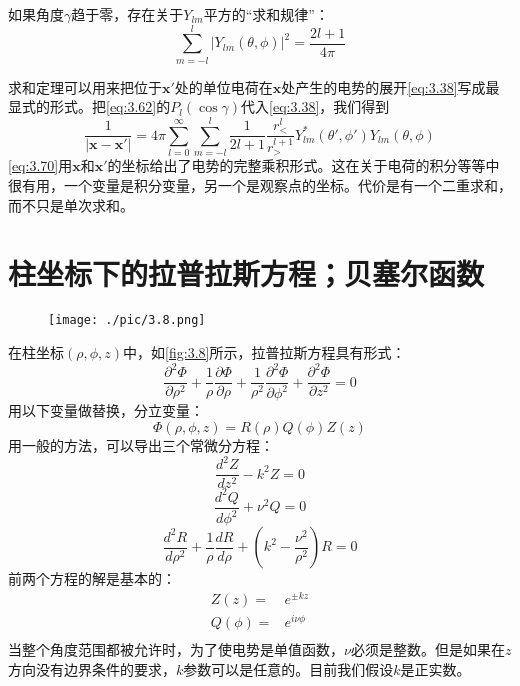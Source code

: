 \documentclass[12pt]{book}
\numberwithin{equation}{chapter}
\numberwithin{figure}{chapter}
\numberwithin{footnote}{page}
\begin{document}
如果角度$\gamma$趋于零，存在关于$Y_{lm}$平方的“求和规律”：
\begin{equation}\label{eq:3.69}
    \sum_{m=-l}^l|Y_{lm}(\theta,\phi)|^2=\frac{2l+1}{4\pi}
\end{equation}

求和定理可以用来把位于$\mathbf{x'}$处的单位电荷在$\mathbf{x}$处产生的电势的展开\autoref{eq:3.38}写成最显式的形式。把\autoref{eq:3.62}的$P_l(\cos\gamma)$代入\autoref{eq:3.38}，我们得到
\begin{equation}\label{eq:3.70}
    \frac{1}{|\mathbf{x}-\mathbf{x'}|}=4\pi \sum_{l=0}^\infty\sum_{m=-l}^l\frac{1}{2l+1}\frac{r_<^l}{r_>^{l+1}}Y_{lm}^*(\theta',\phi')Y_{lm}(\theta,\phi)
\end{equation}
\autoref{eq:3.70}用$\mathbf{x}$和$\mathbf{x'}$的坐标给出了电势的完整乘积形式。这在关于电荷的积分等等中很有用，一个变量是积分变量，另一个是观察点的坐标。代价是有一个二重求和，而不只是单次求和。

\section{柱坐标下的拉普拉斯方程；贝塞尔函数}\label{sec:3.7}

\begin{figure}[!ht]
    \centering
    \texttt{[image: ./pic/3.8.png]}
    \captionsetup{justification=raggedright, singlelinecheck=false}
    \caption{}
    \label{fig:3.8}
\end{figure}

在柱坐标$(\rho,\phi,z)$中，如\autoref{fig:3.8}所示，拉普拉斯方程具有形式：
\begin{equation}\label{eq:3.71}
    \frac{\partial^2\Phi}{\partial\rho^2}+\frac{1}{\rho}\frac{\partial\Phi}{\partial\rho}+\frac{1}{\rho^2}\frac{\partial^2\Phi}{\partial\phi^2}+\frac{\partial^2\Phi}{\partial z^2}=0
\end{equation}
用以下变量做替换，分立变量：
\begin{equation}\label{eq:3.72}
    \Phi(\rho,\phi,z)=R(\rho)Q(\phi)Z(z)
\end{equation}
用一般的方法，可以导出三个常微分方程：
\begin{equation}\label{eq:3.73}
    \frac{d^2Z}{dz^2}-k^2Z=0
\end{equation}
\begin{equation}\label{eq:3.74}
    \frac{d^2Q}{d\phi^2}+\nu^2Q=0
\end{equation}
\begin{equation}\label{eq:3.75}
    \frac{d^2R}{d\rho^2}+\frac{1}{\rho}\frac{dR}{d\rho}+(k^2-\frac{\nu^2}{\rho^2})R=0
\end{equation}
前两个方程的解是基本的：
\begin{equation}\label{eq:3.76}
    \begin{aligned}
        Z(z)=&e^{\pm kz}\\
        Q(\phi)=&e^{i\nu\phi}\\
    \end{aligned}
\end{equation}
当整个角度范围都被允许时，为了使电势是单值函数，$\nu$必须是整数。但是如果在$z$方向没有边界条件的要求，$k$参数可以是任意的。目前我们假设$k$是正实数。
\end{document}
